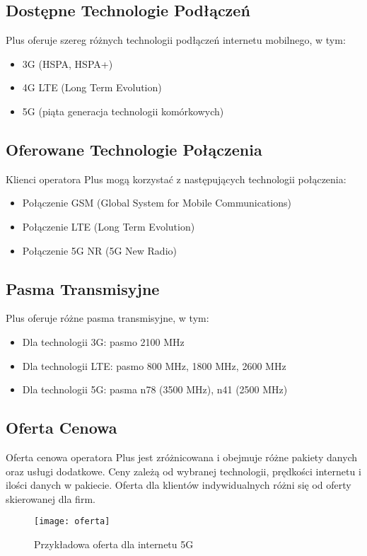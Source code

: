     \pagebreak

\subsection{Dostępne Technologie Podłączeń}
Plus oferuje szereg różnych technologii podłączeń internetu mobilnego, w tym:
\begin{itemize}
    \item 3G (HSPA, HSPA+)
    \item 4G LTE (Long Term Evolution)
    \item 5G (piąta generacja technologii komórkowych)
\end{itemize}

\subsection{Oferowane Technologie Połączenia}
Klienci operatora Plus mogą korzystać z następujących technologii połączenia:
\begin{itemize}
    \item Połączenie GSM (Global System for Mobile Communications)
    \item Połączenie LTE (Long Term Evolution)
    \item Połączenie 5G NR (5G New Radio)
\end{itemize}

\subsection{Pasma Transmisyjne}
Plus oferuje różne pasma transmisyjne, w tym:
\begin{itemize}
    \item Dla technologii 3G: pasmo 2100 MHz
    \item Dla technologii LTE: pasmo 800 MHz, 1800 MHz, 2600 MHz
    \item Dla technologii 5G: pasma n78 (3500 MHz), n41 (2500 MHz)
\end{itemize}

\subsection{Oferta Cenowa}

Oferta cenowa operatora Plus jest zróżnicowana i obejmuje różne pakiety danych oraz usługi dodatkowe. Ceny zależą od wybranej technologii, prędkości internetu i ilości danych w pakiecie. Oferta dla klientów indywidualnych różni się od oferty skierowanej dla firm.

\begin{figure}[!htb]
    \centering
    \texttt{[image: oferta]}
    \caption{Przykładowa oferta dla internetu 5G}
\end{figure}


